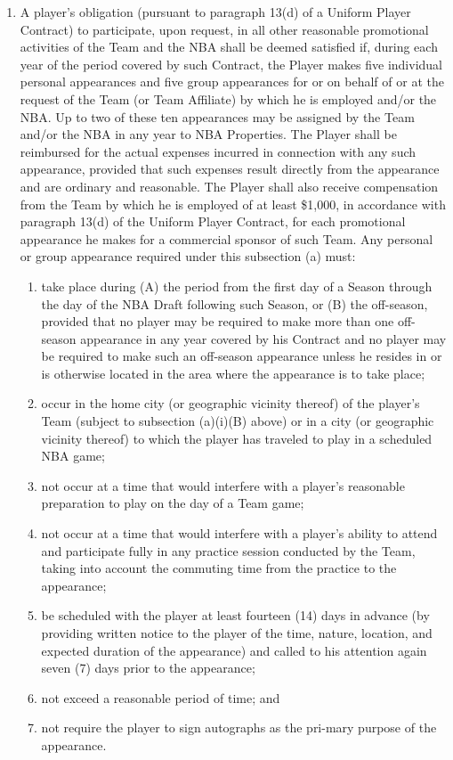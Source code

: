 \documentclass[
]{book}
\providecommand{\tightlist}{%
  \setlength{\itemsep}{0pt}\setlength{\parskip}{0pt}}
\begin{document}
\begin{enumerate}
\def\labelenumi{(\alph{enumi})}
\tightlist
\item
  A player's obligation (pursuant to paragraph 13(d) of a Uniform Player Contract) to participate, upon request, in all other reasonable promotional activities of the Team and the NBA shall be deemed satisfied if, during each year of the period covered by such Contract, the Player makes five individual personal appearances and five group appearances for or on behalf of or at the request of the Team (or Team Affiliate) by which he is employed and/or the NBA. Up to two of these ten appearances may be assigned by the Team and/or the NBA in any year to NBA Properties. The Player shall be reimbursed for the actual expenses incurred in connection with any such appearance, provided that such expenses result directly from the appearance and are ordinary and reasonable. The Player shall also receive compensation from the Team by which he is employed of at least \$1,000, in accordance with paragraph 13(d) of the Uniform Player Contract, for each promotional appearance he makes for a commercial sponsor of such Team. Any personal or group appearance required under this subsection (a) must:

  \begin{enumerate}
  \def\labelenumii{(\roman{enumii})}
  \tightlist
  \item
    take place during (A) the period from the first day of a Season through the day of the NBA Draft following such Season, or (B) the off-season, provided that no player may be required to make more than one off-season appearance in any year covered by his Contract and no player may be required to make such an off-season appearance unless he resides in or is otherwise located in the area where the appearance is to take place;
  \item
    occur in the home city (or geographic vicinity thereof) of the player's Team (subject to subsection (a)(i)(B) above) or in a city (or geographic vicinity thereof) to which the player has traveled to play in a scheduled NBA game;
  \item
    not occur at a time that would interfere with a player's reasonable preparation to play on the day of a Team game;
  \item
    not occur at a time that would interfere with a player's ability to attend and participate fully in any practice session conducted by the Team, taking into account the commuting time from the practice to the appearance;
  \item
    be scheduled with the player at least fourteen (14) days in advance (by providing written notice to the player of the time, nature, location, and expected duration of the appearance) and called to his attention again seven (7) days prior to the appearance;
  \item
    not exceed a reasonable period of time; and
  \item
    not require the player to sign autographs as the pri-mary purpose of the appearance.
  \end{enumerate}
\end{enumerate}
\end{document}
